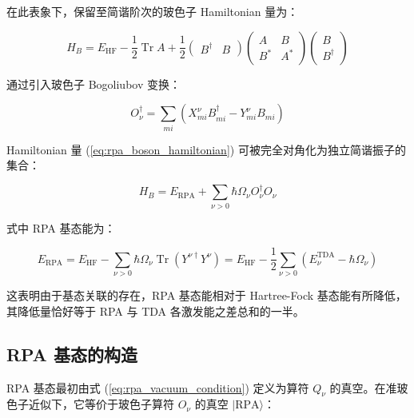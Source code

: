 在此表象下，保留至简谐阶次的玻色子 Hamiltonian 量为：

\begin{equation}
H_{B}=E_{\text{HF}}-\frac{1}{2}\operatorname{Tr}A+\frac{1}{2}\begin{pmatrix}B^{\dagger} & B\end{pmatrix}\begin{pmatrix}A & B\\
B^{*} & A^{*}
\end{pmatrix}\begin{pmatrix}B\\
B^{\dagger}
\end{pmatrix}\label{eq:rpa_boson_hamiltonian}
\end{equation}

通过引入玻色子 Bogoliubov 变换：

\begin{equation}
O^{\dagger}_{\nu}=\sum_{mi}\left(X^{\nu}_{mi}B^{\dagger}_{mi}-Y^{\nu}_{mi}B_{mi}\right)\label{eq:rpa_boson_bogoliubov}
\end{equation}

Hamiltonian 量 (\ref{eq:rpa_boson_hamiltonian}) 可被完全对角化为独立简谐振子的集合：

\begin{equation}
H_{B}=E_{\text{RPA}}+\sum_{\nu>0}\hbar\Omega_{\nu}O^{\dagger}_{\nu}O_{\nu}\label{eq:rpa_diagonal_boson_h}
\end{equation}

式中 RPA 基态能为：

\begin{equation}
E_{\text{RPA}}=E_{\text{HF}}-\sum_{\nu>0}\hbar\Omega_{\nu}\operatorname{Tr}(Y^{\nu\dagger}Y^{\nu})=E_{\text{HF}}-\frac{1}{2}\sum_{\nu>0}\left(E^{\text{TDA}}_{\nu}-\hbar\Omega_{\nu}\right)\label{eq:rpa_ground_energy_lowering}
\end{equation}

这表明由于基态关联的存在，RPA 基态能相对于 Hartree-Fock 基态能有所降低，其降低量恰好等于 RPA 与 TDA 各激发能之差总和的一半。

\subsection{RPA 基态的构造\label{subsec:8.4.6_RPA=0057FA=006001=007684=006784=009020}}

RPA 基态最初由式 (\ref{eq:rpa_vacuum_condition}) 定义为算符 $Q_{\nu}$ 的真空。在准玻色子近似下，它等价于玻色子算符
$O_{\nu}$ 的真空 $|\text{RPA}\rangle$：

